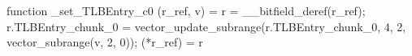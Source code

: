 function _set_TLBEntry_c0 (r_ref, v) = {
    r = __bitfield_deref(r_ref);
    r.TLBEntry_chunk_0 = vector_update_subrange(r.TLBEntry_chunk_0, 4, 2, vector_subrange(v, 2, 0));
    (*r_ref) = r
}
